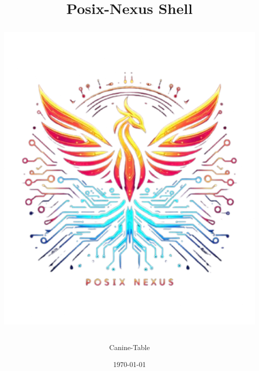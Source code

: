 \documentclass[a4paper,12pt]{article}
\begin{document}
	\label{top}
	\title{
		\hspace{48px}\textbf{Posix-Nexus Shell}\\[10mm]
		\begin{NexMainBox}[dark, shpA,fit, width=\linewidth/2]
			\includegraphics[width=\textwidth]{img/posix-nexus.png}
		\end{NexMainBox}
	}
	\author{Canine-Table}
	\date{\today}
	\maketitle
	\newpage
	\begin{NexMainBox}[light, title=Contents, hdrB, breakable]
		\thispagestyle{plain}
		\tableofcontents
	\end{NexMainBox}
	\newpage
	
	
	
	
	
	
	
	
	
	
	
	
	
\end{document}
